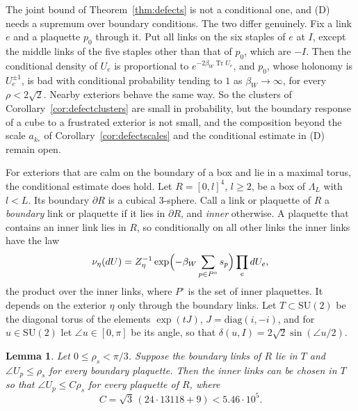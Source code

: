 \documentclass[11pt]{amsart}
\newtheorem{lemma}[theorem]{Lemma}
\theoremstyle{definition}
\theoremstyle{remark}
\numberwithin{equation}{section}
\newcommand{\SU}{\mathrm{SU}}
\newcommand{\Tr}{\operatorname{Tr}}
\begin{document}
The joint bound of Theorem~\ref{thm:defects} is not a conditional one,
and (D) needs a supremum over boundary conditions. The two differ
genuinely. Fix a link $e$ and a plaquette $p_0$ through it. Put all
links on the six staples of $e$ at $I$, except the middle links of the
five staples other than that of $p_0$, which are $-I$. Then the
conditional density of $U_e$ is proportional to $e^{-2\beta_W\Tr U_e}$,
and $p_0$, whose holonomy is $U_e^{\pm1}$, is bad with conditional
probability tending to $1$ as $\beta_W\to\infty$, for every $\rho<2
\sqrt2$. Nearby exteriors behave the same way. So the clusters of
Corollary~\ref{cor:defectclusters} are small in probability, but the
boundary response of a cube to a frustrated exterior is not small, and the
composition beyond the scale $a_{k_*}$ of Corollary~\ref{cor:defectscales}
and the conditional estimate in (D) remain open.

For exteriors that are calm on the boundary of a box and lie in a maximal
torus, the conditional estimate does hold. Let $R=[0,l]^4$, $l\ge2$, be a
box of $\Lambda_L$ with $l<L$. Its boundary $\partial R$ is a cubical
$3$-sphere. Call a link or plaquette of $R$ a \emph{boundary} link or
plaquette if it lies in $\partial R$, and \emph{inner} otherwise. A
plaquette that contains an inner link lies in $R$, so conditionally on all
other links the inner links have the law
\[
\nu_\eta(dU)=Z_\eta^{-1}\exp\Bigl(-\beta_W\sum_{p\in P^\circ}s_p\Bigr)
\prod_edU_e ,
\]
the product over the inner links, where $P^\circ$ is the set of inner
plaquettes. It depends on the exterior $\eta$ only through the boundary
links. Let $T\subset\SU(2)$ be the diagonal torus of the elements
$\exp(tJ)$, $J=\mathrm{diag}(i,-i)$, and for $u\in\SU(2)$ let $\angle u\in
[0,\pi]$ be its angle, so that $\delta(u,I)=2\sqrt2\sin(\angle u/2)$.

\begin{lemma}\label{lem:boxextension}
Let $0\le\rho_s<\pi/3$. Suppose the boundary links of $R$ lie in $T$ and
$\angle U_p\le\rho_s$ for every boundary plaquette. Then the inner links
can be chosen in $T$ so that $\angle U_p\le C\rho_s$ for every plaquette of
$R$, where
\[
C=\sqrt3\,(24\cdot13118+9)<5.46\cdot10^5 .
\]
\end{lemma}
\end{document}

